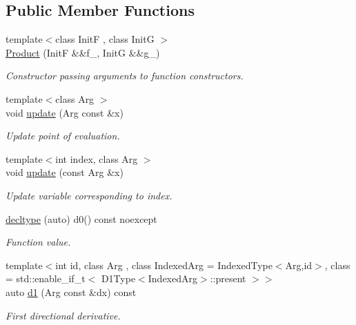 \subsection*{\-Public \-Member \-Functions}
\begin{DoxyCompactItemize}
\item 
{\footnotesize template$<$class Init\-F , class Init\-G $>$ }\\\hyperlink{structFunG_1_1MathematicalOperations_1_1Product_ade95a856ff3ff32f6e6aea2177478589}{\-Product} (\-Init\-F \&\&f\-\_\-, \-Init\-G \&\&g\-\_\-)
\begin{DoxyCompactList}\small\item\em \-Constructor passing arguments to function constructors. \end{DoxyCompactList}\item 
{\footnotesize template$<$class Arg $>$ }\\void \hyperlink{structFunG_1_1MathematicalOperations_1_1Product_a5b45c1bac06651ee5b6ea79fb5128ef9}{update} (\-Arg const \&x)
\begin{DoxyCompactList}\small\item\em \-Update point of evaluation. \end{DoxyCompactList}\item 
{\footnotesize template$<$int index, class Arg $>$ }\\void \hyperlink{structFunG_1_1MathematicalOperations_1_1Product_a8db3d935bbe273c0436ff3bc6bb6b786}{update} (const \-Arg \&x)
\begin{DoxyCompactList}\small\item\em \-Update variable corresponding to index. \end{DoxyCompactList}\item 
\hyperlink{structFunG_1_1MathematicalOperations_1_1Product_aa5339461619fa4aacc2f19a6b828dd69}{decltype} (auto) d0() const noexcept
\begin{DoxyCompactList}\small\item\em \-Function value. \end{DoxyCompactList}\item 
{\footnotesize template$<$int id, class Arg , class Indexed\-Arg  = \-Indexed\-Type$<$\-Arg,id$>$, class  = std\-::enable\-\_\-if\-\_\-t$<$ D1\-Type$<$\-Indexed\-Arg$>$\-::present $>$$>$ }\\auto \hyperlink{structFunG_1_1MathematicalOperations_1_1Product_aea69feaac16f79717a85d7b089a80f8f}{d1} (\-Arg const \&dx) const 
\begin{DoxyCompactList}\small\item\em \-First directional derivative. \end{DoxyCompactList}\item 

\end{DoxyCompactItemize}
